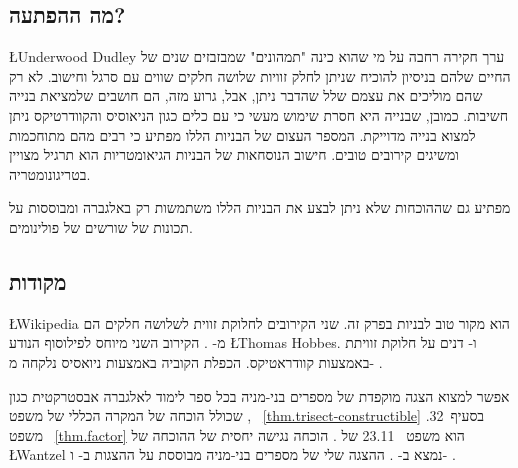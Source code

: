 \subsection*{מה ההפתעה?}

\L{Underwood Dudley}
ערך חקירה רחבה על מי שהוא כינה "תמהונים" שמבזבזים שנים של החיים שלהם בניסיון להוכיח שניתן לחלק זוויות שלושה חלקים שווים עם סרגל וחישוב. לא רק שהם מוליכים את עצמם שלל שהדבר ניתן, אבל, גרוע מזה, הם חושבים שלמציאת בנייה חשיבות. כמובן, שבנייה היא חסרת שימוש מעשי כי עם כלים כגון הניאוסיס והקוודרטיקס ניתן למצוא בנייה מדוייקת. המספר העצום של הבניות הללו מפתיע כי רבים מהם מתוחכמות ומשיגים קירובים טובים. חישוב הנוסחאות של הבניות הגיאומטריות הוא תרגיל מצויין בטריגונומטריה.

מפתיע גם שההוכחות שלא ניתן לבצע את הבניות הללו משתמשות רק באלגברה ומבוססות על תכונות של שורשים של פולינומים.


\subsection*{מקודות}

\L{Wikipedia} \cite{wiki:tri, wiki:neu, wiki:quad}
הוא מקור טוב לבניות בפרק זה. שני הקירובים לחלוקת זווית לשלושה חלקים הם מ-%
\cite[עמודים
67--68, 95--96]{dudley-budget}.
הקירוב השני מיוחס לפילוסוף הנודע
\L{Thomas Hobbes}.
\cite[עמודים~48--49]{martin}
ו-%
\cite[עמודים
6--7]{dudley-budget}
דנים על חלוקת זוויתת באמצעות קוודראטיקס. הכפלת הקוביה באמצעות ניואסיס נלקחה מ-%
 \cite{dorrie2}.

אפשר למצוא הצגה מוקפדת של מספרים בני-מניה בכל ספר לימוד לאלגברה אבסטרקטית כגון
\cite{fraleigh},
שכולל הוכחה של המקרה הכללי של משפט%
~\ref{thm.trisect-constructible}
בסעיף~32.
משפט%
~\ref{thm.factor}
הוא משפט%
~23.11
של
\cite{fraleigh}.
הוכחה נגישה יחסית של ההוכחה של 
\L{Wantzel}
נמצא ב-%
\cite{suzuki}.
ההצגה שלי של מספרים בני-מניה מבוססת על ההצגות ב-%
\cite[פרק~\L{III}]{courant}
ו-%
\cite{laugwitz}.
